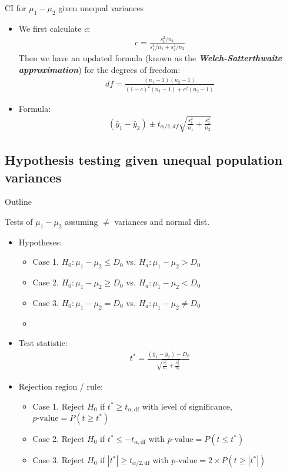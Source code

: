 \documentclass[xcolor=dvipsnames]{beamer}
\begin{document}
\begin{frame}{CI for $\mu_1-\mu_2$ given unequal variances}
	\begin{itemize}
		\item We first calculate $c$: 
		\begin{align*}
		c = \frac{s_1^2 / n_1}{s_1^2 / n_1 + s_2^2/n_2}
		\end{align*}\pause
		Then we have an updated formula (known as the \textbf{\emph{Welch-Satterthwaite approximation}}) for the degrees of freedom:
		\begin{align*}
		df = \frac{(n_1 -1)(n_2-1)}{(1-c)^2(n_1-1)+c^2(n_2-1)}
		\end{align*}\pause
		\item Formula:
		\begin{align*}
			(\bar{y}_1-\bar{y}_2) \pm t_{\alpha / 2, df} \sqrt{\frac{s_1^2}{n_1}+\frac{s_2^2}{n_2}}
		\end{align*}
	\end{itemize}
\end{frame}

\subsection{Hypothesis testing given unequal population variances}
\begin{frame}{Outline}
\tableofcontents[currentsection,subsectionstyle=show/shaded/hide]
\end{frame}

\begin{frame}{Tests of $\mu_1 - \mu_2$ assuming $\neq$ variances and normal dist.}
\begin{itemize}
\item Hypotheses: \pause
\begin{itemize}
	\item Case 1. $H_0: \mu_1 - \mu_2 \leq D_0$ vs. $H_a: \mu_1 - \mu_2 > D_0$ \pause
	\item Case 2. $H_0: \mu_1 - \mu_2 \geq D_0$ vs. $H_a: \mu_1 - \mu_2 < D_0$ \pause
	\item Case 3. $H_0: \mu_1 - \mu_2 = D_0$ vs. $H_a: \mu_1 - \mu_2 \neq D_0$ \pause
	\item[]
\end{itemize}
\item Test statistic:
\begin{align*}
t^* = \frac{(\bar{y}_1-\bar{y}_2)-D_0}{\sqrt{\frac{s^2_1}{n_1}+\frac{s^2_2}{n_2}}}
\end{align*} \pause
\item Rejection region / rule: \pause
\begin{itemize}
	\item Case 1. Reject $H_0$ if $t^* \geq t_{\alpha, \text{df}}$ with level of significance, $p\text{-value}=P(t \geq t^*)$ \pause
	\item Case 2. Reject $H_0$ if $t^* \leq -t_{\alpha, \text{df} }$ with $p\text{-value}=P(t \leq t^*)$ \pause
	\item Case 3. Reject $H_0$ if $|t^*| \geq t_{\alpha / 2, \text{df}}$ with $p\text{-value}=2 \times P(t \geq |t^*|)$
\end{itemize}
\end{itemize}
\end{frame}
\end{document}

